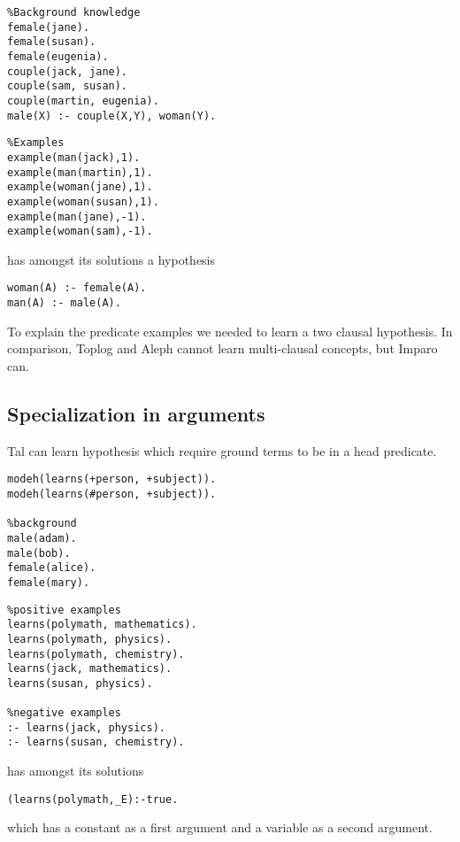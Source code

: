 \begin{minipage}[t]{.50\textwidth}
\begin{lstlisting}
%Background knowledge
female(jane).
female(susan).
female(eugenia).
couple(jack, jane).
couple(sam, susan).
couple(martin, eugenia).
male(X) :- couple(X,Y), woman(Y).
\end{lstlisting}
\end{minipage}
\begin{minipage}[t]{.20\textwidth}
\begin{lstlisting}
%Examples
example(man(jack),1).
example(man(martin),1).
example(woman(jane),1).
example(woman(susan),1).
example(man(jane),-1).
example(woman(sam),-1).
\end{lstlisting}
\end{minipage}

has amongst its solutions a hypothesis
\begin{lstlisting}
woman(A) :- female(A).
man(A) :- male(A).
\end{lstlisting}
To explain the  predicate examples we needed to learn a two clausal hypothesis. In comparison, Toplog and Aleph cannot learn multi-clausal concepts, but Imparo can.

\subsection{Specialization in arguments}
Tal can learn hypothesis which require ground terms to be in a head predicate.

\begin{minipage}[t]{.50\textwidth}
\begin{lstlisting}
modeh(learns(+person, +subject)).
modeh(learns(#person, +subject)).

%background
male(adam).
male(bob).
female(alice).
female(mary).
\end{lstlisting}
\end{minipage}
\begin{minipage}[t]{.20\textwidth}
\begin{lstlisting}
%positive examples
learns(polymath, mathematics).
learns(polymath, physics).
learns(polymath, chemistry).
learns(jack, mathematics).
learns(susan, physics).

%negative examples
:- learns(jack, physics).
:- learns(susan, chemistry).
\end{lstlisting}
\end{minipage}

has amongst its solutions
\begin{lstlisting}
(learns(polymath,_E):-true.
\end{lstlisting}
which has a constant  as a first argument and a variable as a second argument.
